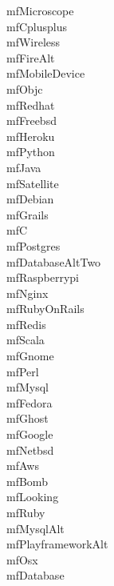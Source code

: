 \documentclass[parskip=half, twocolumn, 13pt]{scrartcl}
\begin{document}
\thispagestyle{empty}
\mfMicroscope{} \quad mfMicroscope \\
\mfCplusplus{} \quad mfCplusplus \\
\mfWireless{} \quad mfWireless \\
\mfFireAlt{} \quad mfFireAlt \\
\mfMobileDevice{} \quad mfMobileDevice \\
\mfObjc{} \quad mfObjc \\
\mfRedhat{} \quad mfRedhat \\
\mfFreebsd{} \quad mfFreebsd \\
\mfHeroku{} \quad mfHeroku \\
\mfPython{} \quad mfPython \\
\mfJava{} \quad mfJava \\
\mfSatellite{} \quad mfSatellite \\
\mfDebian{} \quad mfDebian \\
\mfGrails{} \quad mfGrails \\
\mfC{} \quad mfC \\
\mfPostgres{} \quad mfPostgres \\
\mfDatabaseAltTwo{} \quad mfDatabaseAltTwo \\
\mfRaspberrypi{} \quad mfRaspberrypi \\
\mfNginx{} \quad mfNginx \\
\mfRubyOnRails{} \quad mfRubyOnRails \\
\mfRedis{} \quad mfRedis \\
\mfScala{} \quad mfScala \\
\mfGnome{} \quad mfGnome \\
\mfPerl{} \quad mfPerl \\
\mfMysql{} \quad mfMysql \\
\mfFedora{} \quad mfFedora \\
\mfGhost{} \quad mfGhost \\
\mfGoogle{} \quad mfGoogle \\
\mfNetbsd{} \quad mfNetbsd \\
\mfAws{} \quad mfAws \\
\mfBomb{} \quad mfBomb \\
\mfLooking{} \quad mfLooking \\
\mfRuby{} \quad mfRuby \\
\mfMysqlAlt{} \quad mfMysqlAlt \\
\mfPlayframeworkAlt{} \quad mfPlayframeworkAlt \\
\mfOsx{} \quad mfOsx \\
\mfDatabase{} \quad mfDatabase \\
\end{document}
